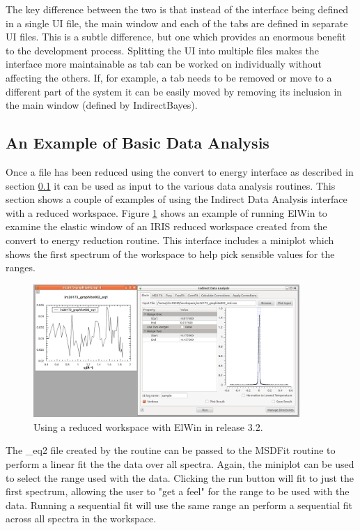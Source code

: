 \documentclass[paper=a4, fontsize=11pt]{scrartcl}	%
\numberwithin{equation}{section}															%
\numberwithin{figure}{section}																%
\numberwithin{table}{section}																%
\begin{document}
The key difference between the two is that instead of the interface being defined in a single UI file, the main window and each of the tabs are defined in separate UI files. This is a subtle difference, but one which provides an enormous benefit to the development process. Splitting the UI into multiple files makes the interface more maintainable as tab can be worked on individually without affecting the others. If, for example, a tab needs to be removed or move to a different part of the system it can be easily moved by removing its inclusion in the main window (defined by IndirectBayes).

\subsection{An Example of Basic Data Analysis}
Once a file has been reduced using the convert to energy interface as described in section \ref{} it can be used as input to the various data analysis routines. This section shows a couple of examples of using the Indirect Data Analysis interface with a reduced workspace. Figure \ref{fig:iris-ida-elwin} shows an example of running ElWin to examine the elastic window of an IRIS reduced workspace created from the convert to energy reduction routine. This interface includes a miniplot which shows the first spectrum of the workspace to help pick sensible values for the ranges.

\begin{figure}[H]
\centering
\includegraphics[width=0.9\textwidth]{img/iris-ida-elwin.png}
\caption{Using a reduced workspace with ElWin in release 3.2.}
\label{fig:iris-ida-elwin}
\end{figure}

The \*\_eq2 file created by the routine can be passed to the MSDFit routine to perform a linear fit the the data over all spectra. Again, the miniplot can be used to select the range used with the data. Clicking the run button will fit to just the first spectrum, allowing the user to "get a feel" for the range to be used with the data. Running a sequential fit will use the same range an perform a sequential fit across all spectra in the workspace.
\end{document}
